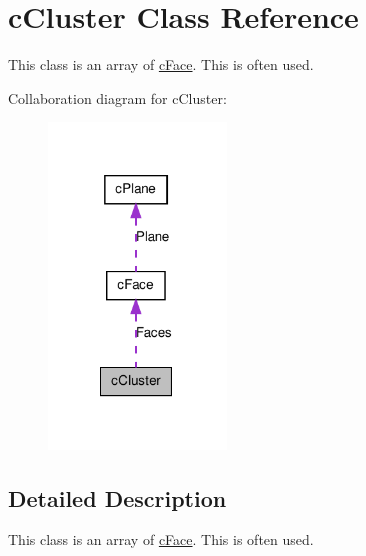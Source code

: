 \hypertarget{classc_cluster}{
\section{cCluster Class Reference}
\label{classc_cluster}
}


This class is an array of \hyperlink{classc_face}{cFace}. This is often used.  




Collaboration diagram for cCluster:\nopagebreak
\begin{figure}[H]
\begin{center}
\leavevmode
\includegraphics[width=134pt]{classc_cluster__coll__graph}
\end{center}
\end{figure}


\subsection{Detailed Description}
This class is an array of \hyperlink{classc_face}{cFace}. This is often used. 